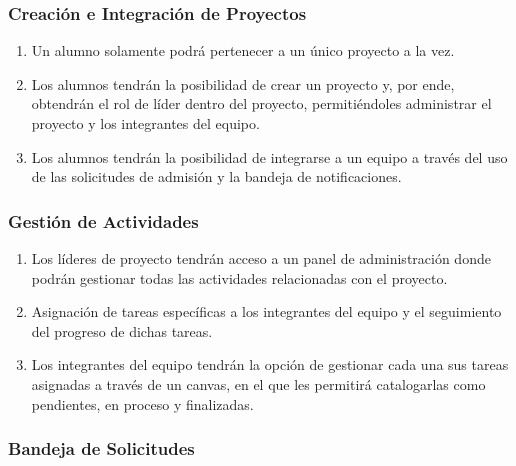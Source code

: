 	\subsubsection{Creación e Integración de Proyectos}

	\begin{enumerate}
		\item Un alumno solamente podrá pertenecer a un único proyecto a la vez.

		\item Los alumnos tendrán la posibilidad de crear un proyecto y, por ende, obtendrán
			el rol de líder dentro del proyecto, permitiéndoles administrar el
			proyecto y los integrantes del equipo.

		\item Los alumnos tendrán la posibilidad de integrarse a un equipo a través del
			uso de las solicitudes de admisión y la bandeja de notificaciones.
	\end{enumerate}

	\subsubsection{Gestión de Actividades}

	\begin{enumerate}
		\item Los líderes de proyecto tendrán acceso a un panel de administración donde
			podrán gestionar todas las actividades relacionadas con el proyecto.

		\item Asignación de tareas específicas a los integrantes del equipo y el seguimiento
			del progreso de dichas tareas.

		\item Los integrantes del equipo tendrán la opción de gestionar cada una sus
			tareas asignadas a través de un canvas, en el que les permitirá
			catalogarlas como pendientes, en proceso y finalizadas.
	\end{enumerate}

	\subsubsection{Bandeja de Solicitudes}

